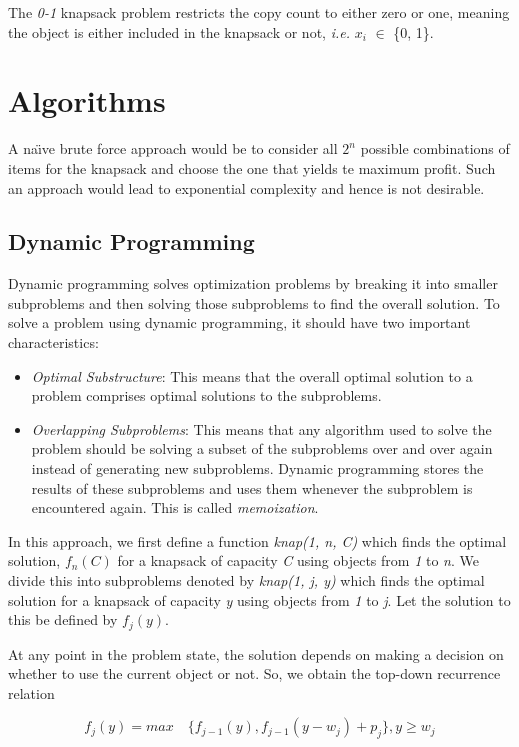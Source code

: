 \documentclass{article}
\begin{document}
The \textit{0-1} knapsack problem restricts the copy count to either zero or one, meaning the object is either included in the knapsack or not, \textit{i.e.} \textit{$x_{i}$} $\in$ \{0, 1\}.

\section{Algorithms}
A na\"{\i}ve brute force approach would be to consider all $2^{n}$ possible combinations of items for the knapsack and choose the one that yields te maximum profit. Such an approach would lead to exponential complexity and hence is not desirable.
\subsection{Dynamic Programming}
Dynamic programming solves optimization problems by breaking it into smaller subproblems and then solving those subproblems to find the overall solution. To solve a problem using dynamic programming, it should have two important characteristics:
\begin{itemize}
	\item \textit{Optimal Substructure}: This means that the overall optimal solution to a problem comprises optimal solutions to the subproblems.
	\item \textit{Overlapping Subproblems}: This means that any algorithm used to solve the problem should be solving a subset of the subproblems over and over again instead of generating new subproblems. Dynamic programming stores the results of these subproblems and uses them whenever the subproblem is encountered again. This is called \textit{memoization}.
\end{itemize}
In this approach, we first define a function \textit{knap(1, n, C)} which finds the optimal solution, $f_{n}(C)$ for a knapsack of capacity \textit{C} using objects from \textit{1} to \textit{n}. We divide this into subproblems denoted by \textit{knap(1, j, y)} which finds the optimal solution for a knapsack of capacity \textit{y} using objects from \textit{1} to \textit{j}. Let the solution to this be defined by $f_{j}(y)$.

At any point in the problem state, the solution depends on making a decision on whether to use the current object or not. So, we obtain the top-down recurrence relation

\begin{equation} \label{eq:knapeq1}
	f_{j}(y) = max \quad \{f_{j-1}(y), f_{j-1}(y-w_{j}) + p_{j}\}, {y \ge w_{j}}
\end{equation}
\end{document}
